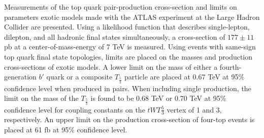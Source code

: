 %

Measurements of the top quark pair-production cross-section and limits on parameters exotic models made with the ATLAS experiment at the Large Hadron Collider are presented.
Using a likelihood function that describes single-lepton, dilepton, and all hadronic final states simultaneously, a cross-section of $177 \pm 11$ pb at a center-of-mass-energy of 7 TeV is measured.
Using events with same-sign top quark final state topologies, limits are placed on the masses and production cross-sections of exotic models.
A lower limit on the mass of either a fourth-generation $b'$ quark or a composite $T_{\frac{5}{3}}$ particle are placed at 0.67 TeV at 95\% confidence level when produced in pairs.
When including single production, the limit on the mass of the $T_{\frac{5}{3}}$ is found to be 0.68 TeV or 0.70 TeV at 95\% confidence level for coupling constants on the $tWT\frac{5}{3}$ vertex of 1 and 3, respectively.
An upper limit on the production cross-section of four-top events is placed at 61 fb at 95\% confidence level.



